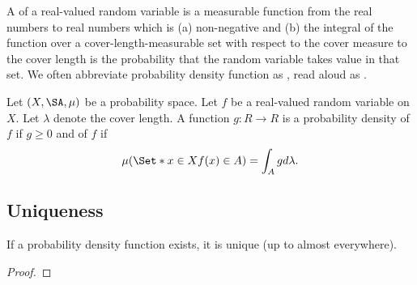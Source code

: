 

A 
of a real-valued random variable is
a measurable function from
the real numbers to
real numbers which is
(a) non-negative and
(b) the integral
of the function over a
cover-length-measurable set
with respect to the cover
measure to the cover length
is
the probability that the
random variable takes
value in that set.
We often abbreviate
probability density
function as ,
read aloud as .


Let $(X, \SA, \mu)$ be a
probability space.
Let $f$ be a real-valued
random variable on $X$.
Let $\lambda$ denote
the cover length.
A function $g: R \to R$
is a probability density
of $f$
if $g \geq 0$ and
of $f$ if
\[
  \mu(\Set*{x \in X}{f(x) \in A}) = \int_{A} g d\lambda.
\]

\subsection{Uniqueness}

\begin{prop}
If a probability density function
exists, it is unique (up to almost
    everywhere).
\begin{proof}
\end{proof}
\end{prop}

\blankpage
